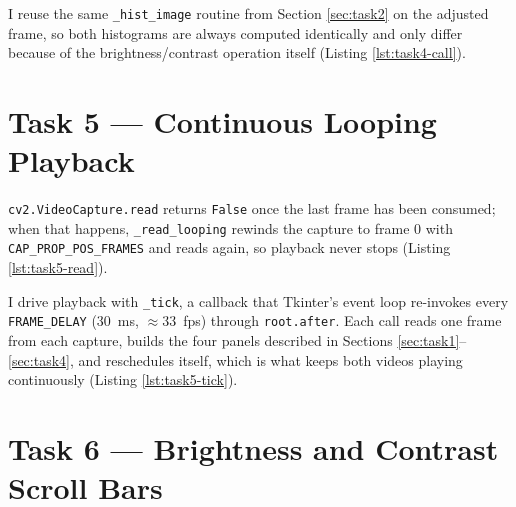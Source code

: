 I reuse the same \texttt{\_hist\_image} routine from Section
\ref{sec:task2} on the adjusted frame, so both histograms are always
computed identically and only differ because of the
brightness/contrast operation itself (Listing \ref{lst:task4-call}).




\section{Task 5 --- Continuous Looping Playback}
\label{sec:task5}


\texttt{cv2.VideoCapture.read} returns \texttt{False} once the last
frame has been consumed; when that happens, \texttt{\_read\_looping}
rewinds the capture to frame 0 with \texttt{CAP\_PROP\_POS\_FRAMES}
and reads again, so playback never stops (Listing
\ref{lst:task5-read}).



I drive playback with \texttt{\_tick}, a callback that Tkinter's
event loop re-invokes every \texttt{FRAME\_DELAY} ($30$~ms, $\approx
33$~fps) through \texttt{root.after}. Each call reads one frame from
each capture, builds the four panels described in Sections
\ref{sec:task1}--\ref{sec:task4}, and reschedules itself, which is
what keeps both videos playing continuously (Listing
\ref{lst:task5-tick}).




\section{Task 6 --- Brightness and Contrast Scroll Bars}
\label{sec:task6}

